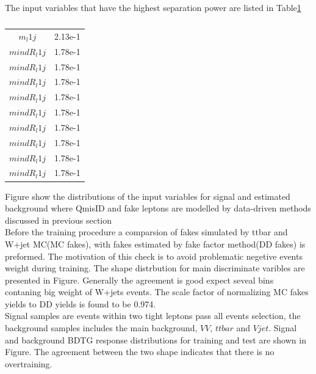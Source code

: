 The input variables that have the highest separation power are listed in Table\ref{tab:separation_power} \\
\begin{table}[h!]
 \begin{center}
   \begin{tabular}{cc}
     \toprule
              &  \\
     \midrule
      $m_l1j$              & 2.13e-1\\
     \midrule       
      $mindR_l1j$          & 1.78e-1\\
     \midrule       
      $mindR_l1j$          & 1.78e-1\\
     \midrule       
      $mindR_l1j$          & 1.78e-1\\
     \midrule       
      $mindR_l1j$          & 1.78e-1\\
     \midrule       
      $mindR_l1j$          & 1.78e-1\\
     \midrule       
      $mindR_l1j$          & 1.78e-1\\
     \midrule       
      $mindR_l1j$          & 1.78e-1\\
     \midrule       
      $mindR_l1j$         & 1.78e-1\\
     \midrule       
      $mindR_l1j$          & 1.78e-1\\
     \bottomrule
   \end{tabular}
   \caption{\label{tab:separation_power}}
 \end{center}
\end{table}
Figure show the distributions of the input variables for signal and estimated background where QmisID and fake leptons are modelled by data-driven methods discussed in previous section\\

Before the training procedure a comparsion of fakes simulated by ttbar and W+jet MC(MC fakes), with fakes estimated by fake factor method(DD fakes) is preformed. The motivation of this check is to avoid problematic negetive events weight during training. The shape distrbution for main discriminate varibles are presented in Figure. Generally the agreement is good expect seveal bins contaning big weight of W+jets events. The scale factor of normalizing MC fakes yields to DD yields is found to be 0.974.\\
Signal samples are events within two tight leptons pass all events selection, the background samples includes the main background, $VV$, $ttbar$ and $Vjet$. Signal and background BDTG response distributions for training and test are shown in Figure. The agreement between the two shape indicates that there is no overtraining.\\


